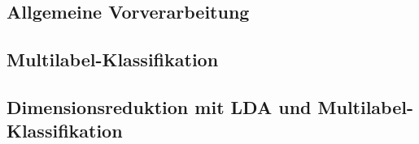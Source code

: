 \subsection{Allgemeine Vorverarbeitung}

\subsection{Multilabel-Klassifikation}

\subsection{Dimensionsreduktion mit LDA und Multilabel-Klassifikation}

